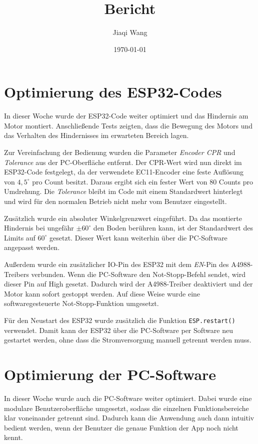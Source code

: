 \documentclass[a4paper,12pt]{article}
\title{Bericht}
\author{Jiaqi Wang}
\date{\today}
\begin{document}
\maketitle


\section{Optimierung des ESP32-Codes}

In dieser Woche wurde der ESP32-Code weiter optimiert und das Hindernis am Motor montiert. Anschließende Tests zeigten, dass die Bewegung des Motors und das Verhalten des Hindernisses im erwarteten Bereich lagen.

Zur Vereinfachung der Bedienung wurden die Parameter \textit{Encoder CPR} und \textit{Tolerance} aus der PC-Oberfläche entfernt. Der CPR-Wert wird nun direkt im ESP32-Code festgelegt, da der verwendete EC11-Encoder eine feste Auflösung von $4{,}5^\circ$ pro Count besitzt. Daraus ergibt sich ein fester Wert von 80 Counts pro Umdrehung. Die \textit{Tolerance} bleibt im Code mit einem Standardwert hinterlegt und wird für den normalen Betrieb nicht mehr vom Benutzer eingestellt.

Zusätzlich wurde ein absoluter Winkelgrenzwert eingeführt. Da das montierte Hindernis bei ungefähr $\pm 60^\circ$ den Boden berühren kann, ist der Standardwert des Limits auf $60^\circ$ gesetzt. Dieser Wert kann weiterhin über die PC-Software angepasst werden.

Außerdem wurde ein zusätzlicher IO-Pin des ESP32 mit dem \textit{EN}-Pin des A4988-Treibers verbunden. Wenn die PC-Software den Not-Stopp-Befehl sendet, wird dieser Pin auf High gesetzt. Dadurch wird der A4988-Treiber deaktiviert und der Motor kann sofort gestoppt werden. Auf diese Weise wurde eine softwaregesteuerte Not-Stopp-Funktion umgesetzt.

Für den Neustart des ESP32 wurde zusätzlich die Funktion \texttt{ESP.restart()} verwendet. Damit kann der ESP32 über die PC-Software per Software neu gestartet werden, ohne dass die Stromversorgung manuell getrennt werden muss.



\section{Optimierung der PC-Software}

In dieser Woche wurde auch die PC-Software weiter optimiert. Dabei wurde eine modulare Benutzeroberfläche umgesetzt, sodass die einzelnen Funktionsbereiche klar voneinander getrennt sind. Dadurch kann die Anwendung auch dann intuitiv bedient werden, wenn der Benutzer die genaue Funktion der App noch nicht kennt.
\end{document}
